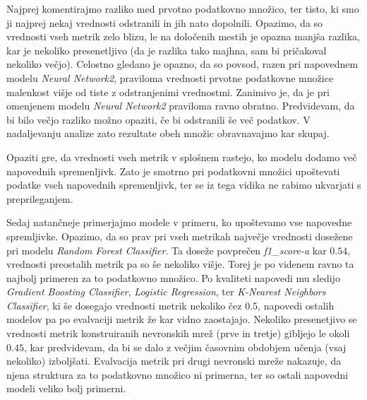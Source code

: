 \documentclass{article}
\begin{document}
Najprej komentirajmo razliko med prvotno podatkovno množico, ter tisto, ki smo ji najprej nekaj vrednosti odstranili in jih nato dopolnili. 
Opazimo, da so vrednosti vseh metrik zelo blizu, le na določenih mestih je opazna manjša razlika, kar je nekoliko presenetljivo (da je razlika tako majhna, sam bi pričakoval nekoliko večjo). 
Celostno gledano je opazno, da so povsod, razen pri napovednem modelu \textit{Neural Network2}, praviloma vrednosti prvotne podatkovne množice malenkost višje od tiste z odstranjenimi vrednostmi. 
Zanimivo je, da je pri omenjenem modelu \textit{Neural Network2} praviloma ravno obratno. Predvidevam, da bi bilo večjo razliko možno opaziti, če bi odstranili še več podatkov.
V nadaljevanju analize zato rezultate obeh množic obravnavajmo kar skupaj. 

Opaziti gre, da vrednosti vseh metrik v splošnem rastejo, ko modelu dodamo več napovednih spremenljivk. 
Zato je smotrno pri podatkovni množici upoštevati podatke vseh napovednih spremenljivk, ter se iz tega vidika ne rabimo ukvarjati s preprileganjem. 

Sedaj natančneje primerjajmo modele v primeru, ko upoštevamo vse napovedne spremljivke. Opazimo, da so prav pri vseh metrikah največje vrednosti dosežene pri modelu \textit{Random Forest Classifier}. 
Ta doseže povprečen \textit{f1\_score-a} kar $0.54$, vrednosti preostalih metrik pa so še nekoliko višje. Torej je po videnem ravno ta najbolj primeren za to podatkovno množico. 
Po kvaliteti napovedi mu sledijo \textit{Gradient Boosting Classifier}, \textit{Logistic Regression}, ter \textit{K-Nearest Neighbors Classifier}, ki še dosegajo vrednosti metrik nekoliko čez $0.5$, 
napovedi ostalih modelov pa po evalvaciji metrik že kar vidno zaostajajo.
Nekoliko presenetjivo se vrednosti metrik konstruiranih nevronskih mrež (prve in tretje) gibljejo le okoli $0.45$, kar predvidevam, da bi se dalo z večjim časovnim obdobjem učenja (vsaj nekoliko) izboljšati. 
Evalvacija metrik pri drugi nevronski mreže nakazuje, da njena struktura za to podatkovno množico ni primerna, ter so ostali napovedni modeli veliko bolj primerni.
\end{document}
